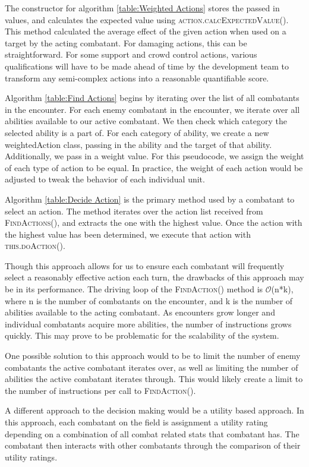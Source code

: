 \documentclass[12pt,a4paper]{report}
\begin{document}
		The constructor for algorithm \ref{table:Weighted Actions} stores the passed in values, and calculates the expected value using \textsc{action.calcExpectedValue()}. This method calculated the average effect of the given action when used on a target by the acting combatant. For damaging actions, this can be straightforward. For some support and crowd control actions, various qualifications will have to be made ahead of time by the development team to transform any semi-complex actions into a reasonable quantifiable score.
		
		Algorithm \ref{table:Find Actions} begins by iterating over the list of all combatants in the encounter. For each enemy combatant in the encounter, we iterate over all abilities available to our active combatant. We then check which category the selected ability is a part of. For each category of ability, we create a new weightedAction class, passing in the ability and the target of that ability. Additionally, we pass in a weight value. For this pseudocode, we assign the weight of each type of action to be equal. In practice, the weight of each action would be adjusted to tweak the behavior of each individual unit. 
		
		Algorithm \ref{table:Decide Action} is the primary method used by a combatant to select an action. The method iterates over the action list received from \textsc{FindActions()}, and extracts the one with the highest value. Once the action with the highest value has been determined, we execute that action with \textsc{this.doAction()}. 
		
		Though this approach allows for us to ensure each combatant will frequently select a reasonably effective action each turn, the drawbacks of this approach may be in its performance. The driving loop of the \textsc{FindAction()} method is $\mathcal{O}$(n*k), where n is the number of combatants on the encounter, and k is the number of abilities available to the acting combatant. As encounters grow longer and individual combatants acquire more abilities, the number of instructions grows quickly. This may prove to be problematic for the scalability of the system. 
		
		One possible solution to this approach would to be to limit the number of enemy combatants the active combatant iterates over, as well as limiting the number of abilities the active combatant iterates through. This would likely create a limit to the number of instructions per call to \textsc{FindAction()}. 
		
		A different approach to the decision making would be a utility based approach. In this approach, each combatant on the field is assignment a utility rating depending on a combination of all combat related stats that combatant has. The combatant then interacts with other combatants through the comparison of their utility ratings. 
		
\end{document}
